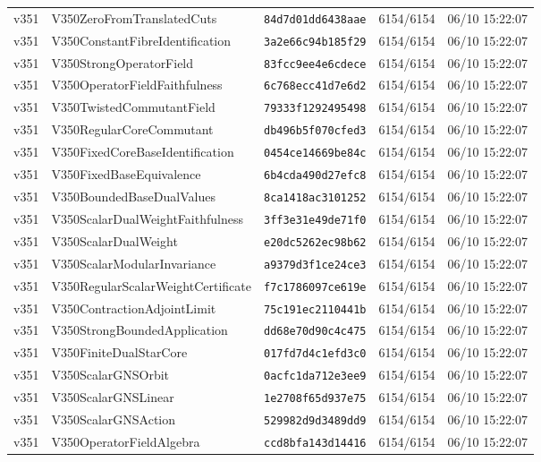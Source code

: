 \documentclass[11pt]{article}
\theoremstyle{definition}\newtheorem{deriv}{Derivation}
\begin{document}
{\begin{longtable}{@{}lllll@{}}
v351 & V350ZeroFromTranslatedCuts & \texttt{84d7d01dd6438aae} & 6154/6154 & 06/10 15:22:07 \\
v351 & V350ConstantFibreIdentification & \texttt{3a2e66c94b185f29} & 6154/6154 & 06/10 15:22:07 \\
v351 & V350StrongOperatorField & \texttt{83fcc9ee4e6cdece} & 6154/6154 & 06/10 15:22:07 \\
v351 & V350OperatorFieldFaithfulness & \texttt{6c768ecc41d7e6d2} & 6154/6154 & 06/10 15:22:07 \\
v351 & V350TwistedCommutantField & \texttt{79333f1292495498} & 6154/6154 & 06/10 15:22:07 \\
v351 & V350RegularCoreCommutant & \texttt{db496b5f070cfed3} & 6154/6154 & 06/10 15:22:07 \\
v351 & V350FixedCoreBaseIdentification & \texttt{0454ce14669be84c} & 6154/6154 & 06/10 15:22:07 \\
v351 & V350FixedBaseEquivalence & \texttt{6b4cda490d27efc8} & 6154/6154 & 06/10 15:22:07 \\
v351 & V350BoundedBaseDualValues & \texttt{8ca1418ac3101252} & 6154/6154 & 06/10 15:22:07 \\
v351 & V350ScalarDualWeightFaithfulness & \texttt{3ff3e31e49de71f0} & 6154/6154 & 06/10 15:22:07 \\
v351 & V350ScalarDualWeight & \texttt{e20dc5262ec98b62} & 6154/6154 & 06/10 15:22:07 \\
v351 & V350ScalarModularInvariance & \texttt{a9379d3f1ce24ce3} & 6154/6154 & 06/10 15:22:07 \\
v351 & V350RegularScalarWeightCertificate & \texttt{f7c1786097ce619e} & 6154/6154 & 06/10 15:22:07 \\
v351 & V350ContractionAdjointLimit & \texttt{75c191ec2110441b} & 6154/6154 & 06/10 15:22:07 \\
v351 & V350StrongBoundedApplication & \texttt{dd68e70d90c4c475} & 6154/6154 & 06/10 15:22:07 \\
v351 & V350FiniteDualStarCore & \texttt{017fd7d4c1efd3c0} & 6154/6154 & 06/10 15:22:07 \\
v351 & V350ScalarGNSOrbit & \texttt{0acfc1da712e3ee9} & 6154/6154 & 06/10 15:22:07 \\
v351 & V350ScalarGNSLinear & \texttt{1e2708f65d937e75} & 6154/6154 & 06/10 15:22:07 \\
v351 & V350ScalarGNSAction & \texttt{529982d9d3489dd9} & 6154/6154 & 06/10 15:22:07 \\
v351 & V350OperatorFieldAlgebra & \texttt{ccd8bfa143d14416} & 6154/6154 & 06/10 15:22:07 \\

\end{longtable}}
\end{document}
